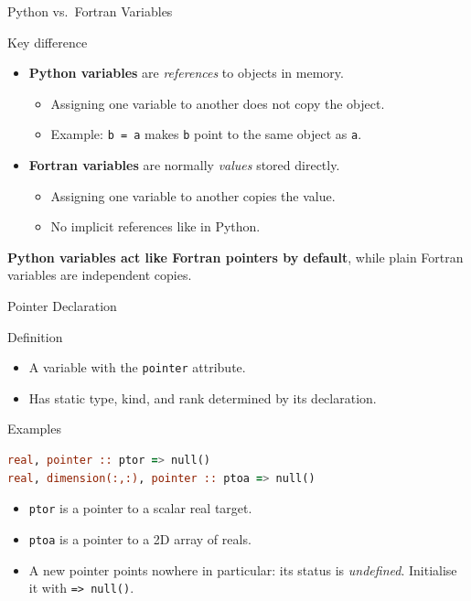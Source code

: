 \begin{frame}{Python vs.~Fortran Variables}
  \begin{block}{Key difference}
    \begin{itemize}
      \item \textbf{Python variables} are \emph{references} to objects in memory.
        \begin{itemize}
          \item Assigning one variable to another does not copy the object.
          \item Example: \texttt{b = a} makes \texttt{b} point to the same object as \texttt{a}.
        \end{itemize}
      \item \textbf{Fortran variables} are normally \emph{values} stored directly.
        \begin{itemize}
          \item Assigning one variable to another copies the value.
          \item No implicit references like in Python.
        \end{itemize}
    \end{itemize}
  \end{block}

  \textbf{Python variables act like Fortran pointers by default}, while plain Fortran variables are independent copies.

\end{frame}


\begin{frame}[fragile]{Pointer Declaration}
  \begin{block}{Definition}
    \begin{itemize}
      \item A variable with the \texttt{pointer} attribute.
      \item Has static type, kind, and rank determined by its declaration.
    \end{itemize}
  \end{block}

  \begin{block}{Examples}
\begin{lstlisting}[language=Fortran]
real, pointer :: ptor => null()
real, dimension(:,:), pointer :: ptoa => null()
\end{lstlisting}
    \begin{itemize}
      \item \texttt{ptor} is a pointer to a scalar real target.
      \item \texttt{ptoa} is a pointer to a 2D array of reals.
      \item A new pointer points nowhere in particular: its status is \emph{undefined}. Initialise it with \texttt{=> null()}.
    \end{itemize}
  \end{block}
\end{frame}


